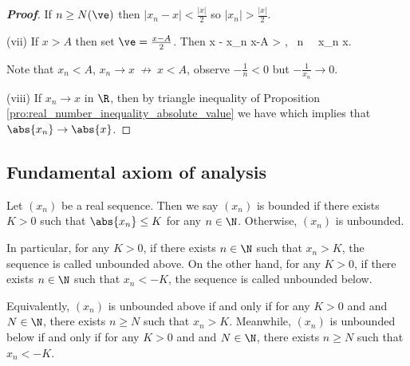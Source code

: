 \begin{proof}[\bf Proof]
If $n \geq N(\ve)$ then $|x_n - x| < \frac{|x|}{2}$ so $|x_n| > \frac{|x|}{2}$.

\item [(vii)] If $x > A$ then set $\ve = \frac{x-A}{2}$. Then
\be
x - x_n \geq x-A > \ve, \ \forall n \ \ra \ x_n \not\to x. %
\ee

Note that $x_n < A$, $x_n \to x \ \not\to\ x < A$, observe $-\frac{1}{n} < 0$ but $-\frac{1}{x_n} \to 0$.

\item [(viii)] If $x_n\to x$ in $\R$, then by triangle inequality of Proposition \ref{pro:real_number_inequality_absolute_value} we have
\be
{} \leq {} 
\ee
which implies that $\abs{x_n} \to \abs{x}$.
\een
\end{proof}



\subsection{Fundamental axiom of analysis}


\begin{definition}
Let $(x_n)$ be a real sequence. Then we say $(x_n)$ is bounded if there exists $K>0$ such that $\abs{x_n} \leq K$ for any $n\in \N$. Otherwise, $(x_n)$ is unbounded. 

In particular, for any $K>0$, if there exists $n\in\N$ such that $x_n > K$, the sequence is called unbounded above. On the other hand, for any $K>0$, if there exists $n\in\N$ such that $x_n < -K$, the sequence is called unbounded below.
\end{definition}

\begin{remark}
Equivalently, $(x_n)$ is unbounded above if and only if for any $K>0$ and and $N\in \N$, there exists $n\geq N$ such that $x_n > K$. Meanwhile, $(x_n)$ is unbounded below if and only if for any $K>0$ and and $N\in \N$, there exists $n\geq N$ such that $x_n < -K$.
\end{remark}


%


